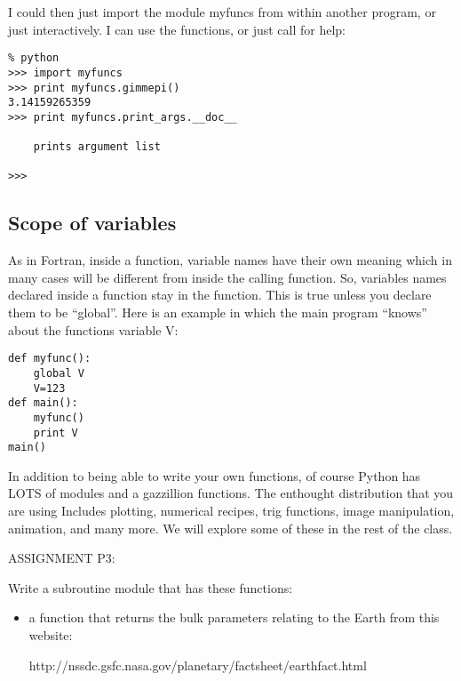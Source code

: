 {\noindent I could then just import the module {\color{blue}myfuncs} from within another program, or just interactively.  I can use the functions, or just call for help:

{\singlespacing \color{blue} \begin{verbatim}
% python
>>> import myfuncs
>>> print myfuncs.gimmepi()
3.14159265359
>>> print myfuncs.print_args.__doc__

    prints argument list

>>>
\end{verbatim}}

\subsection{Scope of variables}

As in Fortran, inside a function,  variable names have their own meaning  which in many cases will be different from inside the calling function.  So,  variables names declared inside a function stay in the function.  This is true unless you declare them to be ``global''.
Here is an example in which the main program  ``knows'' about the functions variable {\color{blue}V}:  

{\singlespacing \color{blue} \begin{verbatim}
def myfunc():
    global V
    V=123
def main():
    myfunc()
    print V
main()
\end{verbatim}}







In addition to being able to write your own functions, of course 
Python has LOTS of modules and a gazzillion functions. The enthought distribution that you are using
Includes plotting, numerical recipes, trig functions, image manipulation, animation,  and many more. We will explore some of these in the rest of the class.  


\noindent
{\color{red}ASSIGNMENT P3:    

\singlespacing 
Write a subroutine module that has these functions:
\begin{itemize}
\item a function that returns the bulk parameters relating to the Earth from this website: 

http://nssdc.gsfc.nasa.gov/planetary/factsheet/earthfact.html


\end{itemize}}}
